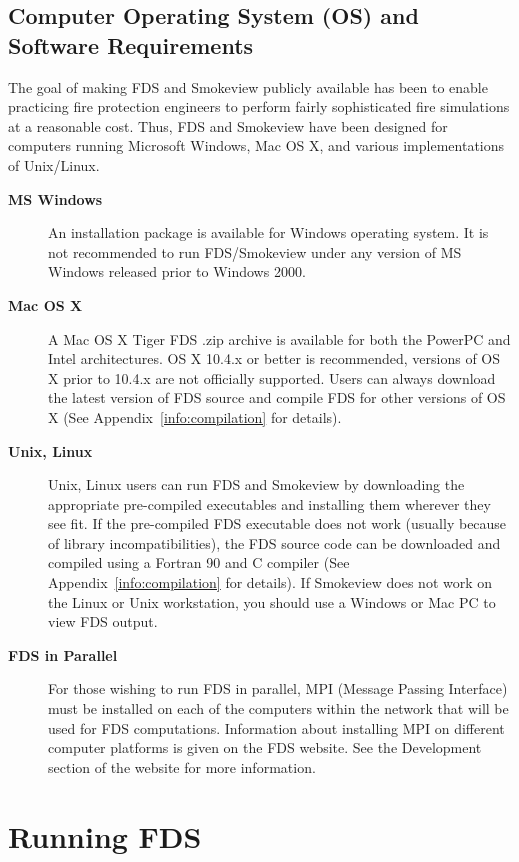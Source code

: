 \documentclass[11pt]{book}
\begin{document}
\section{Computer Operating System (OS) and Software Requirements}
The goal of making FDS and Smokeview publicly available has been to enable
practicing fire protection engineers to perform fairly sophisticated
fire simulations at a reasonable cost. Thus, FDS and Smokeview have been
designed for computers running Microsoft Windows, Mac OS X, and various
implementations of Unix/Linux.

\begin{description}
\item[{\bf MS Windows}]
An installation package is available for Windows operating system.  It is not recommended to run FDS/Smokeview under any version of MS Windows
released prior to Windows 2000.

\item[{\bf Mac OS X}]
A Mac OS X Tiger FDS .zip archive is available for both the PowerPC and Intel architectures.
OS X 10.4.x or better is recommended, versions of OS X prior to 10.4.x are not officially supported.
Users can always download the latest version of FDS source and
compile FDS for other versions of OS X (See Appendix~\ref{info:compilation} for details).

\item[{\bf Unix, Linux}]
Unix, Linux users can run FDS and Smokeview by downloading the appropriate pre-compiled
executables and installing them wherever they see fit. If the pre-compiled
FDS executable does not work (usually because of library incompatibilities),
the FDS source code can be downloaded and compiled using a Fortran 90 and
C compiler (See Appendix~\ref{info:compilation} for details). If Smokeview
does not work on the Linux or Unix workstation, you should use a Windows or Mac PC to view FDS output.

\item[{\bf FDS in Parallel}] For those wishing to run FDS in parallel,
MPI (Message Passing Interface) must be installed on each of the
computers within the network that will be used for FDS computations.
Information about installing MPI on different computer platforms is given on the FDS website.
See the Development section of the website for more information.
\end{description}



\chapter{Running FDS}
\label{info:runningFDS}
\end{document}
